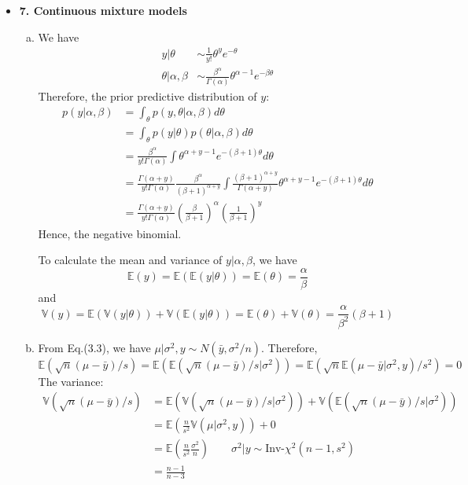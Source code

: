 \documentclass{article}
\begin{document}
\begin{itemize}
\item \textbf{7. Continuous mixture models}
  \begin{enumerate}[(a)]
    \item We have
      \begin{align*}
        y | \theta &\sim \frac{1}{y!} \theta^y e^{-\theta} \\
        \theta | \alpha, \beta &\sim \frac{\beta^{\alpha}}{\Gamma(\alpha)} \theta^{\alpha - 1} e^{-\beta \theta}
      \end{align*}
      Therefore, the prior predictive distribution of $y$:
      \begin{align*}
        p(y | \alpha, \beta) &= \int_{\theta} p(y, \theta | \alpha, \beta) d\theta \\
          &= \int_{\theta} p(y | \theta) p(\theta | \alpha, \beta) d\theta \\
          &= \frac{\beta^{\alpha}}{y!\Gamma(\alpha)} \int \theta^{\alpha + y - 1} e^{-(\beta+1)\theta} d\theta \\
          &= \frac{\Gamma(\alpha+y)}{y!\Gamma(\alpha)} \frac{\beta^{\alpha}}{(\beta + 1)^{\alpha+y}} \int \frac{(\beta+1)^{\alpha+y}}{\Gamma(\alpha+y)} \theta^{\alpha+y-1} e^{-(\beta+1)\theta} d\theta \\
         &= \frac{\Gamma(\alpha + y)}{y! \Gamma(\alpha)} \left( \frac{\beta}{\beta+1} \right)^{\alpha} \left( \frac{1}{\beta+1} \right)^y 
      \end{align*}
      Hence, the negative binomial. 

      To calculate the mean and variance of $y | \alpha, \beta$, we have
      $$
      \mathbb E(y) = \mathbb E \left( \mathbb E(y | \theta) \right) = \mathbb E (\theta) = \frac{\alpha}{\beta}
      $$
      and 
      $$
      \mathbb V(y) = \mathbb E \left( \mathbb V(y | \theta) \right) + \mathbb V \left ( \mathbb E(y|\theta ) \right) = \mathbb E (\theta) + \mathbb V(\theta) = \frac{\alpha}{\beta^2} (\beta + 1)
      $$

     \item From Eq.(3.3), we have $\mu | \sigma^2, y \sim N(\bar y, \sigma^2/n)$. Therefore,
      $$
       \mathbb E(\sqrt n (\mu - \bar y)/s) = \mathbb E \left( \mathbb E(\sqrt n (\mu - \bar y)/s | \sigma^2) \right) = \mathbb E \left( \sqrt n \mathbb E(\mu - \bar y | \sigma^2, y) / s^2 \right) = 0
      $$
    The variance:  
    \begin{align*}
      \mathbb V(\sqrt n (\mu - \bar y)/s) &= \mathbb E \left( \mathbb V( \sqrt n (\mu - \bar y)/s| \sigma^2) \right) + \mathbb V \left ( \mathbb E( \sqrt n (\mu - \bar y)/s|\sigma^2 ) \right) \\
      &= \mathbb E \left( \frac{n}{s^2} \mathbb V(\mu | \sigma^2, y)  \right) + 0 \\
      &= \mathbb E \left( \frac{n}{s^2} \frac{\sigma^2}{n} \right) \qquad \sigma^2|y \sim \text{Inv-}\chi^2(n-1, s^2) \\
      &= \frac{n-1}{n-3} 
    \end{align*}
  

\end{enumerate}
\end{itemize}
\end{document}
